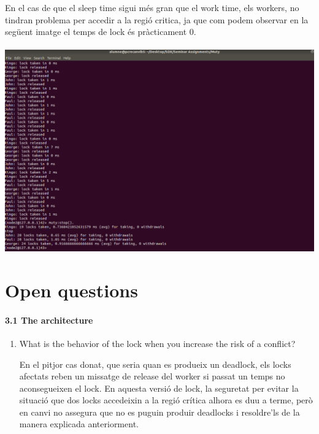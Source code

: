 \documentclass[a4paper, 10pt]{article}
\begin{document}
\begin{enumerate}
En el cas de que el sleep time sigui més gran que el work time, els workers, no tindran problema per accedir a la regió critica, ja que com podem observar en la següent imatge el temps de lock és pràcticament 0.\\\\


\includegraphics[width=\textwidth]{lamp-2}

\end{enumerate}




\newpage
\section{Open questions}
\paragraph[bold]{3.1 The architecture}
\begin{enumerate}
\item What is the behavior of the lock when you increase the risk of a conflict?
\begin{flushleft}
En el pitjor cas donat, que seria quan es produeix un deadlock, els locks afectats reben un missatge
de release del worker si passat un temps no aconsegueixen el lock. En aquesta versió de lock, la seguretat
per evitar la situació que dos locks accedeixin a la regió crítica alhora es duu a terme, però en canvi
no assegura que no es puguin produir deadlocks i resoldre'ls de la manera explicada anteriorment.

\end{flushleft}


\end{enumerate}
\end{document}
